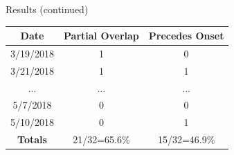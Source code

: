\documentclass[final]{beamer}
\newlength{\onecolwid}
\begin{document}
\begin{frame}[t]
\begin{columns}[t]
\begin{column}{\onecolwid}
\begin{alertblock}{Results (continued)}
	\begin{center}
		\begin{tabular}{|c||c||c|} 
			\hline\hline
			Date & Partial Overlap & Precedes Onset\\
			\hline\hline
			3/19/2018 & 1 & 0\\
			\hline\hline
			3/21/2018 & 1 & 1\\
			\hline\hline
			... & ... & ...\\
			\hline\hline
			5/7/2018 & 0 & 0\\
			\hline\hline
			5/10/2018 & 0 & 1\\
			\hline\hline
			\textbf{Totals} & 21/32=65.6\% & 15/32=46.9\%\\
			\hline\hline
		\end{tabular}
	\end{center}


\end{alertblock}
\end{column}
\end{columns}
\end{frame}
\end{document}

